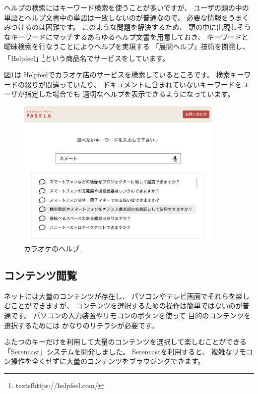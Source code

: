 \documentclass[topics]{compsoft} %
\begin{document}
ヘルプの検索にはキーワード検索を使うことが多いですが、
ユーザの頭の中の単語とヘルプ文書中の単語は一致しないのが普通なので、
必要な情報をうまくみつけるのは困難です\cite{10.1145/32206.32212}。
%
このような問題を解決するため、
頭の中に出現しそうなキーワードにマッチするあらゆるヘルプ文書を用意しておき、
キーワードと曖昧検索を行なうことによりヘルプを実現する
「展開ヘルプ」\cite{ExpandHelp}技術を開発し、
「Helpfeel」\footnote{
  textsf{https:{\slash}{\slash}helpfeel.com{\slash}}
}という商品名でサービスをしています。

図\ref{helpinquiry}は
Helpfeelでカラオケ店のサービスを検索しているところです。
検索キーワードの綴りが間違っていたり、
ドキュメントに含まれていないキーワードをユーザが指定した場合でも
適切なヘルプを表示できるようになっています。

\begin{figure}[t]
  \includegraphics[width=10cm,bb=0 0 1640 1188]{figures/4b2ca6d18537ec8d6922e0389324c3ea.png}
  \caption{カラオケのヘルプ.}
  \label{helpinquiry}
\end{figure}

\subsection{コンテンツ閲覧}

ネットには大量のコンテンツが存在し、
パソコンやテレビ画面でそれらを楽しむことができますが、
コンテンツを選択するための操作は簡単ではないのが普通です。
パソコンの入力装置やリモコンのボタンを使って
目的のコンテンツを選択するためには
かなりのリテラシが必要です。

ふたつのキーだけを利用して大量のコンテンツを選択して楽しむことができる
「Serencast」システムを開発しました\cite{Serencast}。
Serencastを利用すると、
複雑なリモコン操作を全くせずに大量のコンテンツをブラウジングできます。
\end{document}
